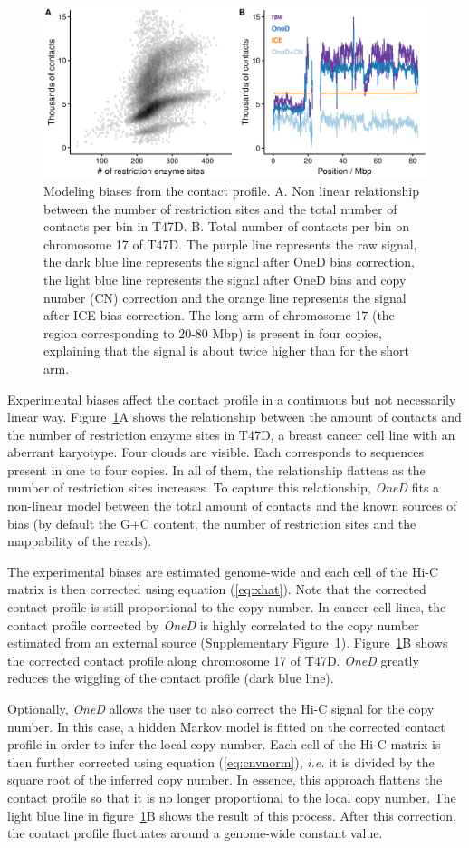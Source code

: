 \documentclass[a4,center,fleqn]{NAR}
\begin{document}
\begin{figure}
\centerline{\includegraphics[width=.49\textwidth]
  {nar_figures/figure_1.eps}}
\caption{Modeling biases from the contact profile. A. Non linear
relationship between the number of restriction sites and the total number
of contacts per bin in T47D. B. Total number of contacts per bin on
chromosome 17 of T47D. The purple line represents the raw signal, the dark blue
line represents the signal after OneD bias correction, the light blue line
represents the signal after OneD bias and copy number (CN) correction and
the orange line represents the signal after ICE bias correction. The long arm
of chromosome 17 (the region corresponding to 20-80 Mbp) is present in
four copies, explaining that the signal is about twice higher than for
the short arm.}
\label{fig:totals}
\end{figure}


Experimental biases affect the contact profile in a continuous but not
necessarily linear way. Figure~\ref{fig:totals}A shows the relationship
between the amount of contacts and the number of restriction enzyme sites
in T47D, a breast cancer cell line with an aberrant karyotype.  Four
clouds are visible. Each corresponds to sequences present in one to four
copies. In all of them, the relationship flattens as the number of
restriction sites increases. To capture this relationship, \textit{OneD}
fits a non-linear model between the total amount of contacts and the known
sources of bias (by default the G+C content, the number of restriction
sites and the mappability of the reads).

The experimental biases are estimated genome-wide and each cell of the
Hi-C matrix is then corrected using equation (\ref{eq:xhat}). Note that
the corrected contact profile is still proportional to the copy number.
In cancer cell lines, the contact profile corrected by \textit{OneD} is
highly correlated to the copy number estimated from an external source
(Supplementary Figure~1). Figure~\ref{fig:totals}B shows the corrected
contact profile along chromosome 17 of T47D. \textit{OneD} greatly reduces
the wiggling of the contact profile (dark blue line).

Optionally, \textit{OneD} allows the user to also correct the Hi-C signal
for the copy number. In this case, a hidden Markov model is fitted on the
corrected contact profile in order to infer the local copy number. Each
cell of the Hi-C matrix is then further corrected using equation
(\ref{eq:cnvnorm}), \textit{i.e.} it is divided by the square root of the
inferred copy number. In essence, this approach flattens the contact
profile so that it is no longer proportional to the local copy number. The
light blue line in figure~\ref{fig:totals}B shows the result of this
process. After this correction, the contact profile fluctuates around a
genome-wide constant value.
\end{document}
